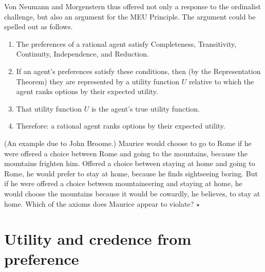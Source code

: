 Von Neumann and Morgenstern thus offered not only a response to the
ordinalist challenge, but also an argument for the MEU Principle. The
argument could be spelled out as follows.

\begin{enumerate}
\item The preferences of a rational agent satisfy Completeness,
  Transitivity, Continuity, Independence, and Reduction.
\item If an agent's preferences satisfy these conditions, then (by the
  Representation Theorem) they are represented by a utility function
  $U$ relative to which the agent ranks options by their expected utility.
\item That utility function $U$ is the agent's true utility function.
\item Therefore: a rational agent ranks options by their expected utility.
\end{enumerate}


\begin{exercise}
  (An example due to John Broome.) Maurice would choose to go to Rome
  if he were offered a choice between Rome and going to the mountains,
  because the mountains frighten him. Offered a choice between staying
  at home and going to Rome, he would prefer to stay at home, because
  he finds sightseeing boring. But if he were offered a choice between
  mountaineering and staying at home, he would choose the mountains
  because it would be cowardly, he believes, to stay at home. Which of
  the axioms does Maurice appear to violate? $\star$
\end{exercise}


\section{Utility and credence from preference}

